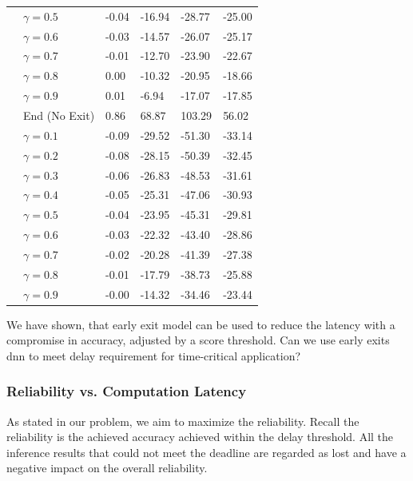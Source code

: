 \begin{minipage}[t]{\linewidth}
\begin{small}
\begin{longtabu}{>{\bfseries}X|X|X[r]|X[r]|X[r]|X[r]}
		&$ \gamma = 0.5 $ 	& -0.04 & -16.94 & -28.77 & -25.00  \tabularnewline
		&$ \gamma = 0.6 $ 	& -0.03 & -14.57 & -26.07 & -25.17  \tabularnewline 
		&$ \gamma = 0.7 $ 	& -0.01 & -12.70 & -23.90 & -22.67  \tabularnewline 
		&$ \gamma = 0.8 $ 	&  0.00 & -10.32 & -20.95 & -18.66  \tabularnewline 
		&$ \gamma = 0.9 $ 	&  0.01 &  -6.94 & -17.07 & -17.85  \tabularnewline 
		\hline
		 & End (No Exit) & 0.86 & 68.87 & 103.29 & 56.02 \tabularnewline {}
		&$ \gamma = 0.1 $ 	& -0.09 & -29.52 & -51.30 & -33.14 \tabularnewline
		&$ \gamma = 0.2 $ 	& -0.08 & -28.15 & -50.39 & -32.45 \tabularnewline 
		&$ \gamma = 0.3 $ 	& -0.06 & -26.83 & -48.53 & -31.61 \tabularnewline
		&$ \gamma = 0.4 $ 	& -0.05 & -25.31 & -47.06 & -30.93 \tabularnewline 
		&$ \gamma = 0.5 $ 	& -0.04 & -23.95 & -45.31 & -29.81 \tabularnewline
		&$ \gamma = 0.6 $ 	& -0.03 & -22.32 & -43.40 & -28.86 \tabularnewline 
		&$ \gamma = 0.7 $ 	& -0.02 & -20.28 & -41.39 & -27.38 \tabularnewline 
		&$ \gamma = 0.8 $ 	& -0.01 & -17.79 & -38.73 & -25.88 \tabularnewline 
		&$ \gamma = 0.9 $ 	& -0.00 & -14.32 & -34.46 & -23.44 \tabularnewline 
		\bottomrule
	\end{longtabu}
\end{small}
\end{minipage}

We have shown, that early exit model can be used to reduce the latency with a compromise in accuracy, adjusted by a score threshold. Can we use early exits \gls{dnn} to meet delay requirement for time-critical application? 

\newpage\subsubsection{Reliability vs. Computation Latency}

As stated in our problem, we aim to maximize the reliability. Recall the reliability is the achieved accuracy achieved within the delay threshold. All the inference results that could not meet the deadline are regarded as lost and have a negative impact on the overall reliability.

